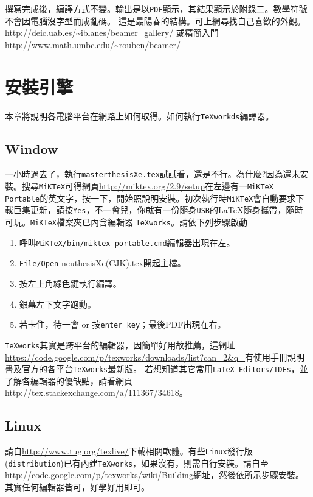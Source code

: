 撰寫完成後，編譯方式不變。輸出是以{\tt PDF}顯示，其結果顯示於附錄二。數學符號不會因電腦沒字型而成亂碼。
這是最陽春的結構。可上網尋找自己喜歡的外觀。\url{http://deic.uab.es/~iblanes/beamer_gallery/}
或精簡入門\url{http://www.math.umbc.edu/~rouben/beamer/}


\chapter{安裝引擎}
本章將說明各電腦平台在網路上如何取得。如何執行{\tt TeXworkds}編譯器。
\section{Window}
一小時過去了，執行{\tt masterthesisXe.tex}試試看，還是不行。為什麼?因為還未安裝。搜尋{\tt MiKTeX}可得網頁\url{http://miktex.org/2.9/setup}在左邊有一{\tt MiKTeX Portable}的英文字，按一下，開始照說明安裝。初次執行時{\tt MiKTeX}會自動要求下載巨集更新，請按{\tt Yes}，不一會兒，你就有一份隨身{\tt USB}的\LaTeX{}隨身攜帶，隨時可玩。{\tt MiKTeX}檔案夾已內含編輯器 {\tt TeXworks}。請依下列步驟啟動

\begin{enumerate}
\item 呼叫{\tt MiKTeX/bin/miktex-portable.cmd}編輯器出現在左。
\item {\tt File/Open} ncuthesisXe(CJK).tex開起主檔。
\item 按左上角綠色鍵執行編譯。
\item 銀幕左下文字跑動。
\item 若卡住，待一會 or 按{\tt enter key}；最後PDF出現在右。
\end{enumerate}

{\tt TeXworks}其實是跨平台的編輯器，因簡單好用故推薦，這網址
\url{https://code.google.com/p/texworks/downloads/list?can=2&q=}有使用手冊說明書及官方的各平台{\tt TeXworks}最新版。
若想知道其它常用{\tt \LaTeX\ Editors/IDEs}，並了解各編輯器的優缺點，請看網頁\url{http://tex.stackexchange.com/a/111367/34618}。
\section{Linux}
請自\url{http://www.tug.org/texlive/}下載相關軟體。有些{\tt Linux}發行版({\tt distribution})已有內建{\tt TeXworks}，如果沒有，則需自行安裝。請自至
\url{http://code.google.com/p/texworks/wiki/Building}網址，然後依所示步驟安裝。其實任何編輯器皆可，好學好用即可。
